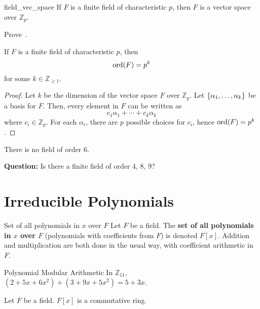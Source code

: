 \begin{Theorem}{}{field_vec_space}
    If $ F $ is a finite field of characteristic $ p $, then $ F $
    is a vector space over $ \mathbb{Z}_p $.
\end{Theorem}

\begin{Exercise}{}{}
    Prove~.
\end{Exercise}

\begin{Theorem}{}{}
    If $ F $ is a finite field of characteristic $ p $, then
    \[ \operatorname{ord}(F)=p^k \]
    for some $ k\in\mathbb{Z}_{\geqslant 1} $.
\end{Theorem}

\begin{proof}
    Let $ k $ be the dimension of the vector space $ F $ over $ \mathbb{Z}_p $.
    Let $ \{\alpha_1,\ldots ,\alpha_k\} $ be a basis for $ F $. Then, every element
    in $ F $ can be written as
    \[ c_1\alpha_1+\cdots+c_k\alpha_k \]
    where $ c_i\in\mathbb{Z}_p $. For each $ \alpha_i $, there are $ p $
    possible choices for $ c_i $, hence $ \operatorname{ord}(F)=p^k $.
\end{proof}

\begin{Example}{}{}
    There is no field of order $ 6 $.
\end{Example}

\textbf{Question:} Is there a finite field of order $ 4,\,8,\,9 $?

\section{Irreducible Polynomials}

\begin{Definition}{Set of all polynomials in $ x $ over $ F $}{}
    Let $ F $ be a field. The \textbf{set of all polynomials in $ x $ over $ F $}
    (polynomials with coefficients from $ F $) is denoted $ F[x] $. Addition
    and multiplication are both done in the usual way, with coefficient arithmetic
    in $ F $.
\end{Definition}

\begin{Example}{Polynomial Modular Arithmetic}{}
    In $ \mathbb{Z}_{11} $, $ (2+5x+6x^2)+(3+9x+5x^2)=5+3x $.
\end{Example}

\begin{Theorem}{}{}
    Let $ F $ be a field. $ F[x] $ is a commutative ring.
\end{Theorem}

